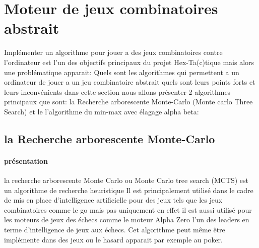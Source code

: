\section{Moteur de jeux combinatoires abstrait}





Implémenter un algorithme pour jouer a des jeux combinatoires contre l'ordinateur est l'un des objectifs principaux du projet
Hex-Ta(c)tique mais alors une problématique apparait: Quels sont les algorithmes qui permettent a un ordinateur
de jouer a un jeu combinatoire abstrait quels sont leurs points forts et leurs inconvénients dans cette section nous allons
présenter 2 algorithmes principaux que sont: la Recherche arborescente Monte-Carlo (Monte carlo Three Search) et le
l'algorithme du min-max avec élagage alpha beta:

\subsection {la Recherche arborescente Monte-Carlo}

\paragraph {présentation}
la recherche arborescente Monte Carlo ou Monte Carlo tree search (MCTS) est un algorithme de recherche heuristique
Il est principalement utilisé dans le cadre de mis en place d'intelligence artificielle pour des jeux tels que les jeux combinatoires
comme le go mais pas uniquement en effet il est aussi utilisé pour les moteurs de jeux des échecs comme le moteur Alpha Zero 
l'un des leaders en terme d'intelligence de jeux aux échecs. Cet algorithme peut même être implémente dans des jeux ou le hasard 
apparait par exemple au poker.

